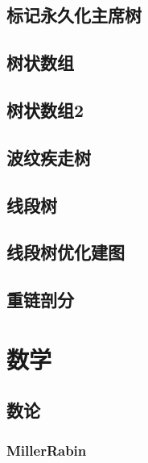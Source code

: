 \documentclass{article}
\begin{document}
\begin{multicols*}{3}
\subsection{标记永久化主席树}


\subsection{树状数组}


\subsection{树状数组2}


\subsection{波纹疾走树}


\subsection{线段树}


\subsection{线段树优化建图}


\subsection{重链剖分}


\section{数学}
\subsection{数论}
\subsubsection{MillerRabin}



\end{multicols*}
\end{document}
